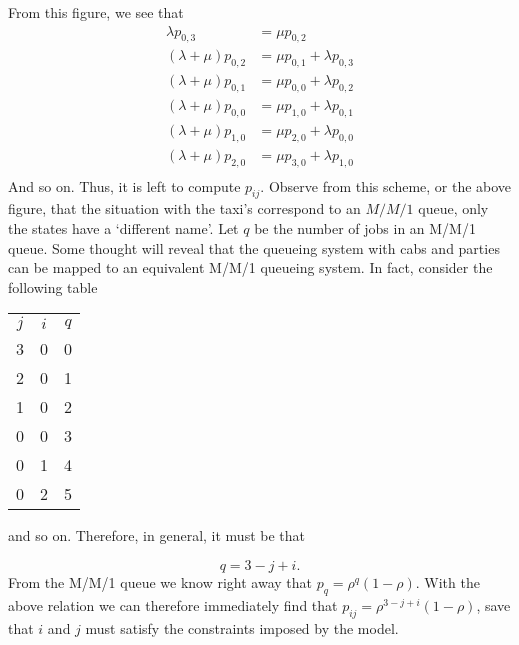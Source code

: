 \begin{exercise}
\begin{solution}
\begin{center}
      
    \end{center}

From this figure, we see that
\begin{align*}
\lambda p_{0,3} &= \mu p_{0,2} \\
(\lambda+\mu) p_{0,2} &= \mu p_{0,1} + \lambda p_{0,3}\\
(\lambda+\mu) p_{0,1} &= \mu p_{0,0} + \lambda p_{0,2}\\
(\lambda+\mu) p_{0,0} &= \mu p_{1,0} + \lambda p_{0,1}\\
(\lambda+\mu) p_{1,0} &= \mu p_{2,0} + \lambda p_{0,0}\\
(\lambda+\mu) p_{2,0} &= \mu p_{3,0} + \lambda p_{1,0}\\
\end{align*}
And so on. Thus, it is left to compute $p_{ij}$. Observe from this
scheme, or the above figure, that the situation with the taxi's
correspond to an $M/M/1$ queue, only the states have a `different
name'. Let $q$ be the number of jobs in an M/M/1 queue. Some thought
will reveal that the queueing system with cabs and parties can be
mapped to an equivalent M/M/1 queueing system. In fact, consider the
following table
\begin{center}
\begin{tabular}{ccc}
$j$ & $i$ & $q$\\
3&         0 &         0\\
2 &        0&          1\\
1 &        0&          2\\
0&         0&          3\\
0&         1&          4\\
0&         2&          5\\
\end{tabular}
\end{center}
and so on. Therefore, in general, it must be that 

\begin{equation*}
q = 3 - j +i.
\end{equation*}
From the M/M/1 queue we know right away that $p_q = \rho^q
(1-\rho)$.  With the above relation we can therefore immediately find
that $p_{ij} = \rho^{3-j+i}(1-\rho)$, save that $i$ and
$j$ must satisfy the constraints imposed by the model.


\end{solution}
\end{exercise}

